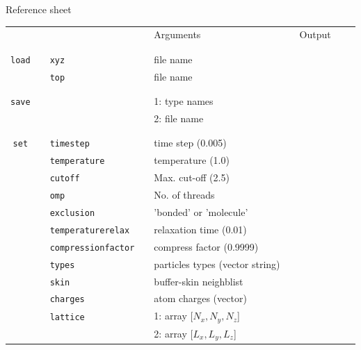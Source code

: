 \documentclass[11pt]{article}
\begin{document}
\begin{center}

  {\huge{Reference sheet}}
  
  \bigskip

  \bigskip
  
  \begin{tabular}{cclclcccc}
    {\color{red}{\textbf{Action}}} && {\color{blue}{Specifier}} && Arguments && Output \\
                                   && && && \\
    \hline
                                   && && && \\
    \verb!load! && \verb!xyz! && file name && \\
    $\mbox{}$ && \verb!top! && file name && \\
                                   && && && \\
    \hline
    && && && \\
    \verb!save! &&  && 1: type names && \\
                &&  && 2: file name && \\
                                   && && && \\
    \hline
                                   && && && \\
    \verb!set! && \verb!timestep! && time step (0.005) && \\
    $\mbox{}$  && \verb!temperature! && temperature (1.0) && \\
    $\mbox{}$  && \verb!cutoff! && Max. cut-off (2.5) && \\
    $\mbox{}$  && \verb!omp! && No. of threads && \\
    $\mbox{}$ && \verb!exclusion! && 'bonded' or 'molecule' && \\
    $\mbox{}$ && \verb!temperaturerelax! && relaxation time (0.01) && \\
    $\mbox{}$ && \verb!compressionfactor! && compress factor (0.9999) && \\
    $\mbox{}$ && \verb!types! && particles types (vector string) && \\
    $\mbox{}$ && \verb!skin! && buffer-skin neighblist && \\
    $\mbox{}$ && \verb!charges! && atom charges (vector) && \\
    $\mbox{}$ && \verb!lattice! && 1: array [$N_x , N_y , N_z$] && \\
    $\mbox{}$ && $\mbox{}$      && 2: array [$L_x, L_y, L_z$] && \\

\end{tabular}
\end{center}
\end{document}
